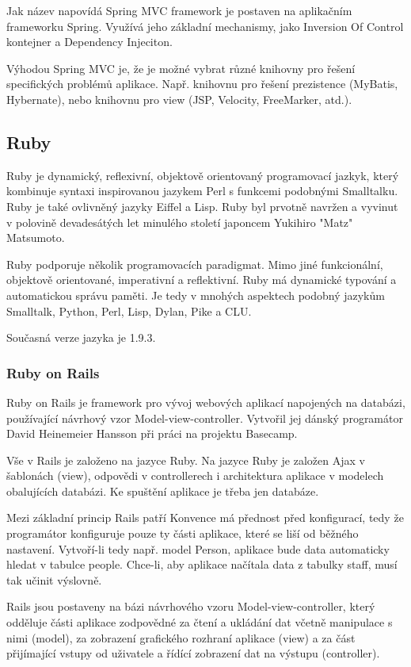 Jak název napovídá Spring MVC framework je postaven na aplikačním frameworku Spring. Využívá jeho základní mechanismy, jako Inversion Of Control kontejner a Dependency Injeciton.

Výhodou Spring MVC je, že je možné vybrat různé knihovny pro řešení specifických problémů aplikace. Např. knihovnu pro řešení prezistence (MyBatis, Hybernate), nebo knihovnu pro view (JSP, Velocity, FreeMarker, atd.)\cite{liu2006research}.

\subsection{Ruby}
\label{sec:ruby}
Ruby je dynamický, reflexivní, objektově orientovaný programovací jazkyk, který kombinuje syntaxi inspirovanou jazykem Perl s funkcemi podobnými Smalltalku. Ruby je také ovlivněný jazyky Eiffel a Lisp. Ruby byl prvotně navržen a vyvinut v polovině devadesátých let minulého století japoncem Yukihiro "Matz" Matsumoto.

Ruby podporuje několik programovacích paradigmat. Mimo jiné funkcionální, objektově orientované, imperativní a reflektivní. Ruby má dynamické typování a automatickou správu paměti. Je tedy v mnohých aspektech podobný jazykům Smalltalk, Python, Perl, Lisp, Dylan, Pike a CLU.

Současná verze jazyka je 1.9.3.
\subsubsection{Ruby on Rails}
\label{sec:ror}
Ruby on Rails je framework pro vývoj webových aplikací napojených na databázi, používající návrhový vzor Model-view-controller. Vytvořil jej dánský programátor David Heinemeier Hansson při práci na projektu Basecamp\cite{website:wiki:ror}.

Vše v Rails je založeno na jazyce Ruby. Na jazyce Ruby je založen Ajax v šablonách (view), odpovědi v controllerech i architektura aplikace v modelech obalujících databázi. Ke spuštění aplikace je třeba jen databáze.

Mezi základní princip Rails patří Konvence má přednost před konfigurací, tedy že programátor konfiguruje pouze ty části aplikace, které se liší od běžného nastavení. Vytvoří-li tedy např. model Person, aplikace bude data automaticky hledat v tabulce people. Chce-li, aby aplikace načítala data z tabulky staff, musí tak učinit výslovně.

Rails jsou postaveny na bázi návrhového vzoru Model-view-controller, který odděluje části aplikace zodpovědné za čtení a ukládání dat včetně manipulace s nimi (model), za zobrazení grafického rozhraní aplikace (view) a za část přijímající vstupy od uživatele a řídící zobrazení dat na výstupu (controller).

